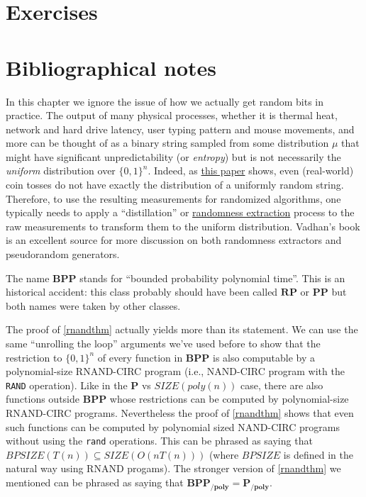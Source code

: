 \section{Exercises}\label{Exercises}

\section{Bibliographical notes}\label{modelrandbibnotes}

In this chapter we ignore the issue of how we actually get random bits
in practice. The output of many physical processes, whether it is
thermal heat, network and hard drive latency, user typing pattern and
mouse movements, and more can be thought of as a binary string sampled
from some distribution \(\mu\) that might have significant
unpredictability (or \emph{entropy}) but is not necessarily the
\emph{uniform} distribution over \(\{0,1\}^n\). Indeed, as
\href{http://statweb.stanford.edu/~susan/papers/headswithJ.pdf}{this
paper} shows, even (real-world) coin tosses do not have exactly the
distribution of a uniformly random string. Therefore, to use the
resulting measurements for randomized algorithms, one typically needs to
apply a ``distillation'' or
\href{https://en.wikipedia.org/wiki/Randomness_extractor}{randomness
extraction} process to the raw measurements to transform them to the
uniform distribution. Vadhan's book \cite{vadhan2012pseudorandomness} is
an excellent source for more discussion on both randomness extractors
and pseudorandom generators.

The name \(\mathbf{BPP}\) stands for ``bounded probability polynomial
time''. This is an historical accident: this class probably should have
been called \(\mathbf{RP}\) or \(\mathbf{PP}\) but both names were taken
by other classes.

The proof of \cref{rnandthm} actually yields more than its statement. We
can use the same ``unrolling the loop'' arguments we've used before to
show that the restriction to \(\{0,1\}^n\) of every function in
\(\mathbf{BPP}\) is also computable by a polynomial-size RNAND-CIRC
program (i.e., NAND-CIRC program with the \texttt{RAND} operation). Like
in the \(\mathbf{P}\) vs \(\ensuremath{\mathit{SIZE}}(poly(n))\) case,
there are also functions outside \(\mathbf{BPP}\) whose restrictions can
be computed by polynomial-size RNAND-CIRC programs. Nevertheless the
proof of \cref{rnandthm} shows that even such functions can be computed
by polynomial sized NAND-CIRC programs without using the \texttt{rand}
operations. This can be phrased as saying that
\(\ensuremath{\mathit{BPSIZE}}(T(n)) \subseteq \ensuremath{\mathit{SIZE}}(O(n T(n)))\)
(where \(\ensuremath{\mathit{BPSIZE}}\) is defined in the natural way
using RNAND progams). The stronger version of \cref{rnandthm} we
mentioned can be phrased as saying that
\(\mathbf{BPP_{/poly}} = \mathbf{P_{/poly}}\).
